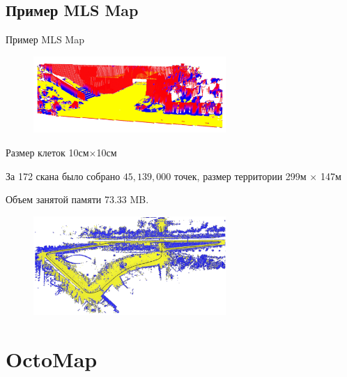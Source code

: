 \documentclass[9pt]{beamer}
\begin{document}
\subsection{Пример MLS Map}
\begin{frame}{Пример MLS Map}

\begin{figure}[h]
    \centering
    \includegraphics[width=0.65\textwidth]{mls_m.png}
\end{figure}

Размер клеток 10см$\times$10см

За 172 скана было собрано $45,139,000$ точек, размер территории 299м $\times$ 147м

Объем занятой памяти 73.33 MB.

\begin{figure}[h]
    \centering
    \includegraphics[width=0.65\textwidth]{mls_g.png}
\end{figure}


\end{frame}

\section{OctoMap}
\end{document}
